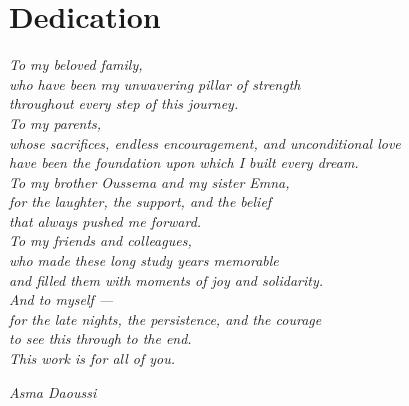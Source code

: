 \chapter*{Dedication}
\thispagestyle{empty}

\vspace*{3cm}

\begin{center}
\textit{\large To my beloved family,}\\[1em]
\textit{who have been my unwavering pillar of strength\\
throughout every step of this journey.}\\[2em]

\textit{To my parents,}\\
\textit{whose sacrifices, endless encouragement, and unconditional love\\
have been the foundation upon which I built every dream.}\\[2em]

\textit{To my brother Oussema and my sister Emna,}\\
\textit{for the laughter, the support, and the belief\\
that always pushed me forward.}\\[2em]

\textit{To my friends and colleagues,}\\
\textit{who made these long study years memorable\\
and filled them with moments of joy and solidarity.}\\[2em]

\textit{And to myself —}\\
\textit{for the late nights, the persistence, and the courage\\
to see this through to the end.}\\[2em]

\textit{This work is for all of you.}
\end{center}

\vfill
\begin{flushright}
\textit{Asma Daoussi}
\end{flushright}
